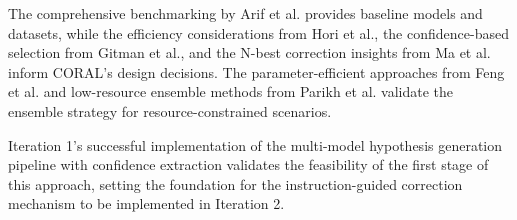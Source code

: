 The comprehensive benchmarking by Arif et al. provides baseline models and datasets, while the efficiency considerations from Hori et al., the confidence-based selection from Gitman et al., and the N-best correction insights from Ma et al. inform CORAL's design decisions. The parameter-efficient approaches from Feng et al. and low-resource ensemble methods from Parikh et al. validate the ensemble strategy for resource-constrained scenarios.

Iteration 1's successful implementation of the multi-model hypothesis generation pipeline with confidence extraction validates the feasibility of the first stage of this approach, setting the foundation for the instruction-guided correction mechanism to be implemented in Iteration 2.